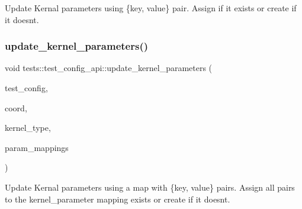Update Kernal parameters using \{key, value\} pair. Assign if it exists or create if it doesn\textquotesingle{}t. 

\mbox{\label{namespacetests_1_1test__config__api_aaedc4b39408b717d3868dbb7387bdc48}} 
\subsubsection{\texorpdfstring{update\+\_\+kernel\+\_\+parameters()}{update\_kernel\_parameters()}\hspace{0.1cm}{\footnotesize\ttfamily [2/3]}}
{\footnotesize\ttfamily void tests\+::test\+\_\+config\+\_\+api\+::update\+\_\+kernel\+\_\+parameters (\begin{DoxyParamCaption}\item[{\hyperlink{structtests_1_1TestConfig}{Test\+Config} \&}]{test\+\_\+config,  }\item[{\hyperlink{structllk_1_1xy__pair}{llk\+::xy\+\_\+pair}}]{coord,  }\item[{\hyperlink{namespacetests_a4f360b8af533762256ff97513bfd6a0d}{tests\+::\+Kernel\+Type}}]{kernel\+\_\+type,  }\item[{std\+::map$<$ std\+::string, std\+::string $>$}]{param\+\_\+mappings }\end{DoxyParamCaption})}



Update Kernal parameters using a map with \{key, value\} pairs. Assign all pairs to the kernel\+\_\+parameter mapping exists or create if it doesn\textquotesingle{}t. 

\mbox{\label{namespacetests_1_1test__config__api_a7c5f36113ab125d7740af42d52f9939c}} 

